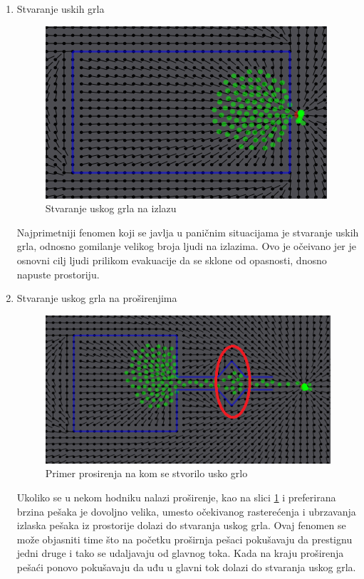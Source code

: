 \documentclass[12pt]{article}
\begin{document}
\begin{enumerate}
\item Stvaranje uskih grla

\begin{figure}
\centering
\includegraphics{UG} %
\caption{Stvaranje uskog grla na izlazu}
\end{figure}

Najprimetniji fenomen koji se javlja u paničnim situacijama je stvaranje uskih grla, odnosno gomilanje velikog broja ljudi na izlazima. Ovo je očeivano jer je osnovni cilj ljudi prilikom evakuacije da se sklone od opasnosti, dnosno napuste prostoriju.

\item Stvaranje uskog grla na proširenjima

\begin{figure}[h]
\centering
\includegraphics{Guzva}
\caption{Primer prosirenja na kom se stvorilo usko grlo}
\label{fig:guzva}
\end{figure}

Ukoliko se u nekom hodniku nalazi proširenje, kao na slici \ref{fig:guzva} i preferirana brzina pešaka je dovoljno velika, umesto očekivanog rasterećenja i ubrzavanja izlaska pešaka iz prostorije dolazi do stvaranja uskog grla. Ovaj fenomen se može objasniti time što na početku proširnja pešaci pokušavaju da prestignu jedni druge i tako se udaljavaju od glavnog toka. Kada na kraju proširenja pešaći ponovo pokušavaju da uđu u glavni tok dolazi do stvaranja uskog grla.


\end{enumerate}
\end{document}
